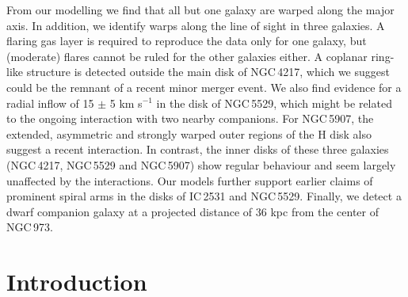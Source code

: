 \documentclass{aa}
\begin{document}
{From our modelling we find that all but one galaxy are warped along the major axis. In addition, we identify warps along the line of sight in three galaxies. A flaring gas layer is required to reproduce the data only for one galaxy, but (moderate) flares cannot be ruled for the other galaxies either. A coplanar ring-like structure is detected outside the main disk of NGC\,4217, which we suggest could be the remnant of a recent minor merger event. We also find evidence for a radial inflow of 15 $\pm$ 5 km s$^{-1}$ in the disk of NGC\,5529, which might be related to the ongoing interaction with two nearby companions. For NGC\,5907, the extended, asymmetric and strongly warped outer regions of the H{} disk also suggest a recent interaction. In contrast, the inner disks of these three galaxies (NGC\,4217, NGC\,5529 and NGC\,5907) show regular behaviour and seem largely unaffected by the interactions. Our models further support earlier claims of prominent spiral arms in the disks of IC\,2531 and NGC\,5529. Finally, we detect a dwarf companion galaxy at a projected distance of 36 kpc from the center of NGC\,973.}
{}
\maketitle

\section{Introduction}
\end{document}
